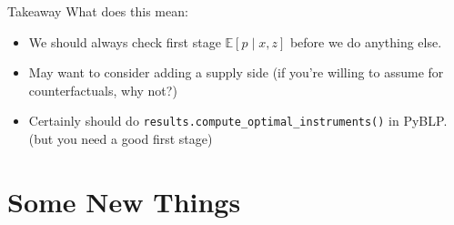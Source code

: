 




\begin{frame}{Takeaway}
What does this mean:
\begin{itemize}
    \item We should always check \alert{first stage} $\mathbb{E}[p \mid x, z]$ before we do anything else.
    \item May want to consider adding a supply side (if you're willing to assume for counterfactuals, why not?)
    \item Certainly should do \texttt{results.compute\_optimal\_instruments()} in PyBLP. (but you need a good first stage)
\end{itemize}
\end{frame}


\section{Some New Things}

